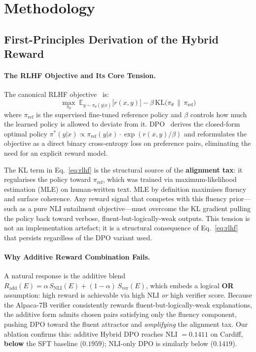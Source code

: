 \section{Methodology}
\label{sec:methodology}

\subsection{First-Principles Derivation of the Hybrid Reward}
\label{sec:first_principles}

\paragraph{The RLHF Objective and Its Core Tension.}
The canonical RLHF objective~\cite{ouyang2022training} is:
\begin{equation}
\max_{\pi_\theta}\; \mathbb{E}_{y \sim \pi_\theta(y|x)}\bigl[r(x,y)\bigr] - \beta\,\text{KL}\bigl(\pi_\theta \,\|\, \pi_\text{ref}\bigr)
\label{eq:rlhf}
\end{equation}
where $\pi_\text{ref}$ is the supervised fine-tuned reference policy and $\beta$ controls how much the learned policy is allowed to deviate from it.
DPO~\cite{rafailov2023direct} derives the closed-form optimal policy
$\pi^*(y|x) \propto \pi_\text{ref}(y|x)\cdot\exp(r(x,y)/\beta)$ and reformulates the objective as a direct binary cross-entropy loss on preference pairs, eliminating the need for an explicit reward model.

The KL term in Eq.~\ref{eq:rlhf} is the structural source of the \textbf{alignment tax}: it regularises the policy toward $\pi_\text{ref}$, which was trained via maximum-likelihood estimation (MLE) on human-written text. MLE by definition maximises fluency and surface coherence. Any reward signal that competes with this fluency prior---such as a pure NLI entailment objective---must overcome the KL gradient pulling the policy back toward verbose, fluent-but-logically-weak outputs.
This tension is not an implementation artefact; it is a structural consequence of Eq.~\ref{eq:rlhf} that persists regardless of the DPO variant used.

\paragraph{Why Additive Reward Combination Fails.}
A natural response is the additive blend $R_\text{add}(E) = \alpha\,S_\text{NLI}(E) + (1-\alpha)\,S_\text{ver}(E)$, which embeds a logical \textbf{OR} assumption: high reward is achievable via high NLI \emph{or} high verifier score. Because the Alpaca-7B verifier consistently rewards fluent-but-logically-weak explanations, the additive form admits chosen pairs satisfying only the fluency component, pushing DPO toward the fluent attractor and \emph{amplifying} the alignment tax. Our ablation confirms this: additive Hybrid DPO reaches NLI $=0.1411$ on Cardiff, \textbf{below} the SFT baseline ($0.1959$); NLI-only DPO is similarly below ($0.1419$).

